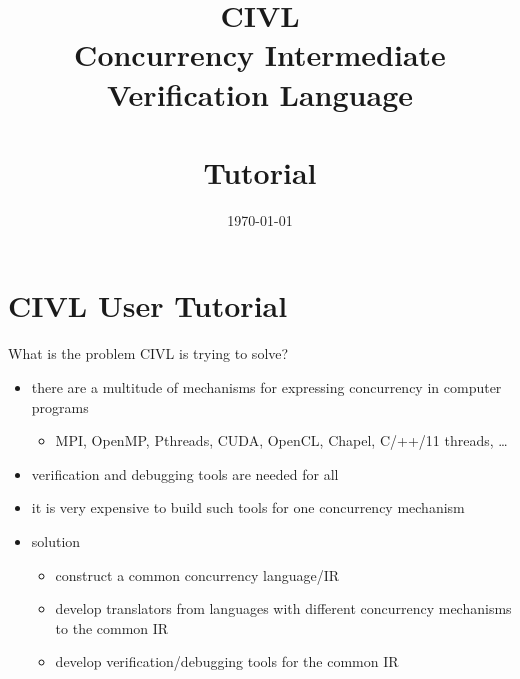 \documentclass[t]{beamer}
\date{\today}
\title{{\huge\bf CIVL}\\
  Concurrency Intermediate Verification Language\\ \ \\
  Tutorial}
\begin{document}
\begin{frame}[plain]
  \titlepage
\end{frame}


\section{CIVL User Tutorial}

\begin{frame}{What is the problem CIVL is trying to solve?}
  \begin{itemize}
  \item there are a multitude of mechanisms for expressing concurrency
    in computer programs
    \begin{itemize}
    \item MPI, OpenMP, Pthreads, CUDA, OpenCL, Chapel, C/++/11
      threads, \ldots
    \end{itemize}
  \item verification and debugging tools are needed for all
  \item it is very expensive to build such tools for one concurrency
    mechanism
  \item \alert{solution}
    \begin{itemize}
    \item construct a common concurrency language/IR
    \item develop translators from languages with different
      concurrency mechanisms to the common IR
    \item develop verification/debugging tools for the common IR
    \end{itemize}
  \end{itemize}
\end{frame}
\end{document}

